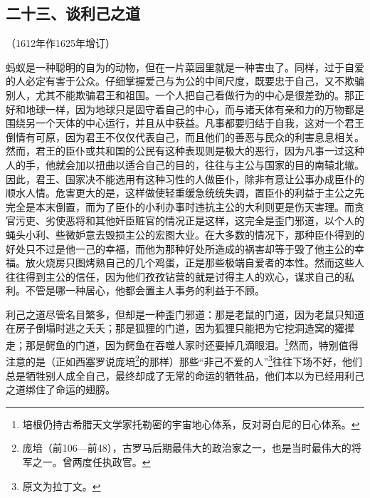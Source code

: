 \subsection*{二十三、谈利己之道}
\begin{center}
    （1612年作1625年增订）
\end{center}
\par 蚂蚁是一种聪明的自为的动物，但在一片菜园里就是一种害虫了。同样，过于自爱的人必定有害于公众。仔细掌握爱己与为公的中间尺度，既要忠于自己，又不欺骗别人，尤其不能欺骗君王和祖国。一个人把自己看做行为的中心是很差劲的。那正好和地球一样，因为地球只是固守着自己的中心，而与诸天体有亲和力的万物都是围绕另一个天体的中心运行，并且从中获益。凡事都要归结于自我，这对一个君王倒情有可原，因为君王不仅仅代表自己，而且他们的善恶与民众的利害息息相关。然而，君王的臣仆或共和国的公民有这种表现则是极大的恶行，因为凡事一过这种人的手，他就会加以扭曲以适合自己的目的，往往与主公与国家的目的南辕北辙。因此，君王、国家决不能选用有这种习性的人做臣仆，除非有意让公事办成臣仆的顺水人情。危害更大的是，这样做使轻重缓急统统失调，置臣仆的利益于主公之先完全是本末倒置，而为了臣仆的小利办事时违抗主公的大利则更是伤天害理。而贪官污吏、劣使恶将和其他奸臣赃官的情况正是这样，这完全是歪门邪道，以个人的蝇头小利、些微妒意去毁损主公的宏图大业。在大多数的情况下，那种臣仆得到的好处只不过是他一己的幸福，而他为那种好处所造成的祸害却等于毁了他主公的幸福。放火烧房只图烤熟自己的几个鸡蛋，正是那些极端自爱者的本性。然而这些人往往得到主公的信任，因为他们孜孜钻营的就是讨得主人的欢心，谋求自己的私利。不管是哪一种居心，他都会置主人事务的利益于不顾。
\par 利己之道尽管名目繁多，但却是一种歪门邪道：那是老鼠的门道，因为老鼠只知道在房子倒塌时逃之夭夭；那是狐狸的门道，因为狐狸只能把为它挖洞造窝的獾撵走；那是鳄鱼的门道，因为鳄鱼在吞噬人家时还要掉几滴眼泪。\footnote{培根仍持古希腊天文学家托勒密的宇宙地心体系，反对哥白尼的日心体系。}然而，特别值得注意的是（正如西塞罗说庞培\footnote{庞培（前106—前48），古罗马后期最伟大的政治家之一，也是当时最伟大的将军之一。曾两度任执政官。}的那样）那些“非己不爱的人”\footnote{原文为拉丁文。}往往下场不好，他们总是牺牲别人成全自己，最终却成了无常的命运的牺牲品，他们本以为已经用利己之道绑住了命运的翅膀。




